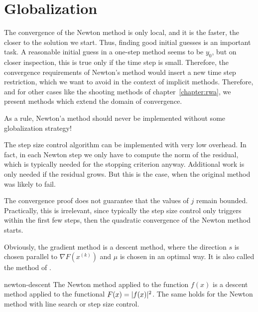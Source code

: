 \section{Globalization}

\begin{intro}
  The convergence of the Newton method is only local, and it is the
  faster, the closer to the solution we start. Thus, finding good
  initial guesses is an important task. A reasonable initial guess in
  a one-step method seems to be $y_0$, but on closer inspection, this
  is true only if the time step is small. Therefore, the convergence
  requirements of Newton's method would insert a new time step
  restriction, which we want to avoid in the context of implicit
  methods. Therefore, and for other cases like the shooting
  methods of chapter~\ref{chapter:rwa}, we present
  methods which extend the domain of convergence.

  As a rule, Newton'a method should never be implemented without some
  globalization strategy!
\end{intro}




\begin{remark}
  The step size control algorithm can be implemented with very low
  overhead. In fact, in each Newton step we only have to compute the
  norm of the residual, which is typically needed for the stopping
  criterion anyway. Additional work is only needed if the residual
  grows. But this is the case, when the original method was likely to
  fail.

  The convergence proof does not guarantee that the values of $j$
  remain bounded. Practically, this is irrelevant, since typically the
  step size control only triggers within the first few steps, then the
  quadratic convergence of the Newton method starts.
\end{remark}



\begin{remark}
  Obviously, the gradient method is a descent method, where the direction $s$
  is chosen parallel to $\nabla F(x^{(k)})$ and $\mu$ is chosen in an
  optimal way. It is also called the method of .
\end{remark}

\begin{Lemma}{newton-descent}
  The Newton method applied to the function $f(x)$ is a descent method
  applied to the functional $F(x) = \lvert f(x)\rvert^2$. The same holds for
  the Newton method with line search or step size control.
\end{Lemma}

